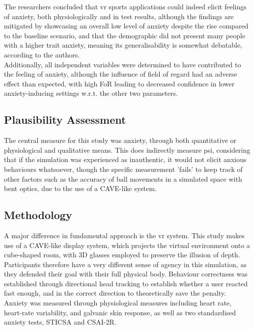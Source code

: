 The researchers concluded that \gls{vr} sports applications could indeed elicit feelings of anxiety, both physiologically and in test results, although the findings are mitigated by showcasing an overall low level of anxiety despite the rise compared to the baseline scenario, and that the demographic did not present many people with a higher trait anxiety, meaning its generalisability is somewhat debatable, according to the authors.\\
Additionally, all independent variables were determined to have contributed to the feeling of anxiety, although the influence of field of regard had an adverse effect than expected, with high FoR leading to decreased confidence in lower anxiety-inducing settings w.r.t. the other two parameters.

\subsection{Plausibility Assessment}

The central measure for this study was anxiety, through both quantitative or physiological and qualitative means. This does indirectly measure \gls{psi}, considering that if the simulation was experienced as inauthentic, it would not elicit anxious behaviours whatsoever, though the specific measurement 'fails' to keep track of other factors such as the accuracy of ball movements in a simulated space with bent optics, due to the use of a CAVE-like system.

\subsection{Methodology}

A major difference in fundamental approach is the \gls{vr} system. This study makes use of a CAVE-like display system, which projects the virtual environment onto a cube-shaped room, with 3D glasses employed to preserve the illusion of depth.\\
Participants therefore have a very different sense of agency in this simulation, as they defended their goal with their full physical body. Behaviour correctness was established through directional head tracking to establish whether a user reacted fast enough, and in the correct direction to theoretically save the penalty.\\

Anxiety was measured through physiological measures including heart rate, heart-rate variability, and galvanic skin response, as well as two standardised anxiety tests, STICSA and CSAI-2R.\\

